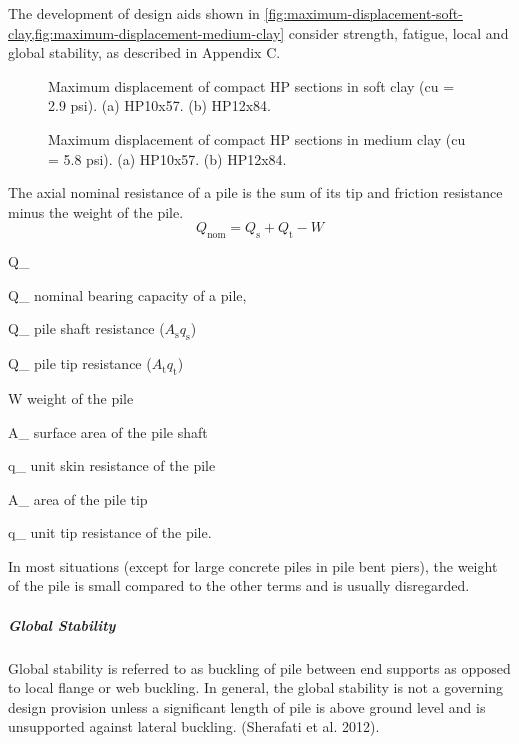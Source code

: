 The development of design aids shown in \cref{fig:maximum-displacement-soft-clay,fig:maximum-displacement-medium-clay} consider strength, fatigue, local and global stability, as described in Appendix C.

\begin{figure}
  \caption{Maximum displacement of compact HP sections in soft clay (cu = 2.9 psi). (a) HP10x57. (b) HP12x84.}
  \label{fig:maximum-displacement-soft-clay}
\end{figure}

\begin{figure}
  \caption{Maximum displacement of compact HP sections in medium clay (cu = 5.8 psi). (a) HP10x57. (b) HP12x84.}
  \label{fig:maximum-displacement-medium-clay}
\end{figure}

The axial nominal resistance of a pile is the sum of its tip and friction resistance minus the weight of the pile.
\begin{equation}
  Q_\text{nom} =Q_\text{s} + Q_\text{t} -W
\end{equation}
\begin{EqDesc}{Q_}
  \item [Q_\text{nom}]nominal bearing capacity of a pile,
  \item [Q_\text{s}] pile shaft resistance  ($A_\text{s}q_\text{s}$)
  \item [Q_\text{t}] pile tip resistance ($A_\text{t}q_\text{t}$)
  \item [W] weight of the pile
  \item [A_\text{s}] surface area of the pile shaft
  \item [q_\text{s}] unit skin resistance of the pile
  \item [A_\text{f}] area of the pile tip
  \item [q_\text{f}] unit tip resistance of the pile.
\end{EqDesc}

In most situations (except for large concrete piles in pile bent piers), the weight of the pile is small compared to the other terms and is usually disregarded.

\subparagraph{Global Stability}
Global stability is referred to as buckling of pile between end supports as opposed to local flange or web buckling. In general, the global stability is not a governing design provision unless a significant length of pile is above ground level and is unsupported against lateral buckling. (Sherafati et al. 2012).

